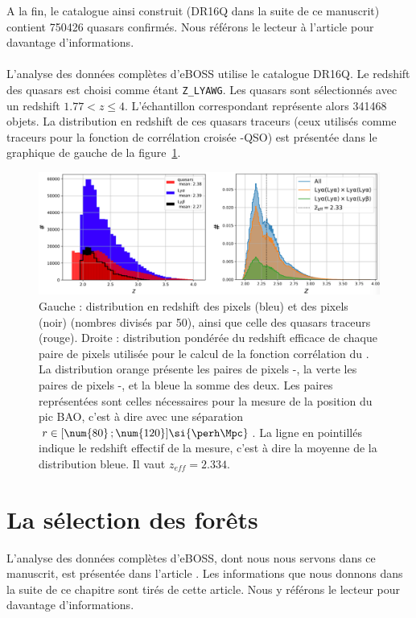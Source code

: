 A la fin, le catalogue ainsi construit (DR16Q dans la suite de ce manuscrit) contient \num{750426} quasars confirmés. Nous référons le lecteur à l'article \textcite{Lyke2020} pour davantage d'informations.



\paragraph{}
L'analyse \lya{} des données complètes d'eBOSS \autocite{DuMasdesBourboux2020} utilise le catalogue DR16Q. Le redshift des quasars est choisi comme étant \texttt{Z\_LYAWG}. Les quasars sont sélectionnés avec un redshift $\num{1.77} < z \leq 4$. L'échantillon correspondant représente alors \num{341468} objets. La distribution en redshift de ces quasars traceurs (ceux utilisés comme traceurs pour la fonction de corrélation croisée \lya{}-QSO) est présentée dans le graphique de gauche de la figure~\ref{fig:pixel_number}.
\begin{figure}
  \centering
  \includegraphics[scale=0.4]{pixel_number}
  \caption{Gauche : distribution en redshift des pixels \lyalya{} (bleu) et des pixels\lyalyb{} (noir) (nombres divisés par 50), ainsi que celle des quasars traceurs (rouge). Droite : distribution pondérée du redshift efficace de chaque paire de pixels utilisée pour le calcul de la fonction corrélation du \lya{}. La distribution orange présente les paires de pixels \lyalya{}-\lyalya{}, la verte les paires de pixels \lyalya{}-\lyalyb{}, et la bleue la somme des deux. Les paires représentées sont celles nécessaires pour la mesure de la position du pic BAO, c'est à dire avec une séparation $r \in [\num{80} \,; \num{120}] \si{\perh\Mpc}$. La ligne en pointillés indique le redshift effectif de la mesure, c'est à dire la moyenne de la distribution bleue. Il vaut $z_{eff} = \num{2.334}$.}
  \label{fig:pixel_number}
\end{figure}


\section{La sélection des forêts}
\label{sec:selection_forets}
L'analyse \lya{} des données complètes d'eBOSS, dont nous nous servons dans ce manuscrit, est présentée dans l'article \textcite{DuMasdesBourboux2020}. Les informations que nous donnons dans la suite de ce chapitre sont tirés de cette article. Nous y référons le lecteur pour davantage d'informations.

